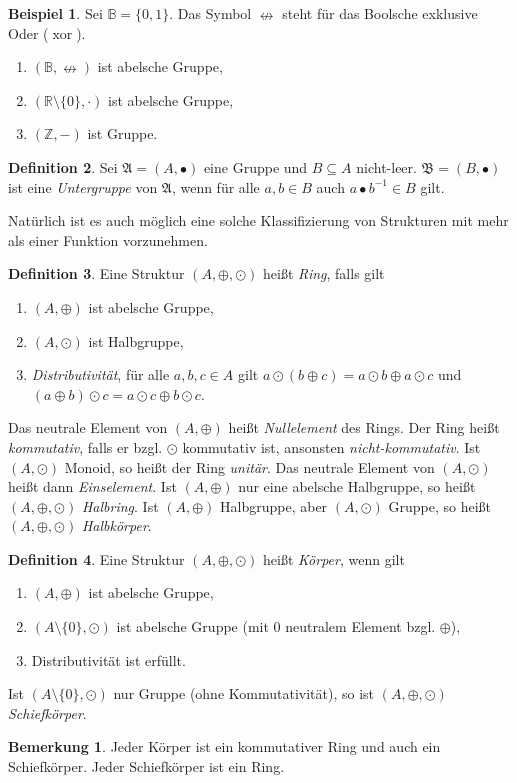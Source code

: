 \documentclass[11pt, a4paper]{article}
\theoremstyle{definition}
\newtheorem{definition}{Definition}[section]
\newtheorem{example}[definition]{Beispiel}
\newtheorem*{remark*}{Bemerkung}
\theoremstyle{plain}
\numberwithin{equation}{section}
\DeclareMathOperator{\xor}{xor}
\begin{document}
\begin{example}
	Sei \( \mathbb{B} = \{ 0, 1 \} \). Das Symbol \( \nleftrightarrow \) steht für das Boolsche exklusive Oder (\( \xor \)).
	\begin{enumerate}
		\item \( (\mathbb{B}, \nleftrightarrow) \) ist abelsche Gruppe,
		\item \( (\mathbb{R} \setminus \{ 0 \}, \cdot) \) ist abelsche Gruppe,
		\item \( (\mathbb{Z}, -) \) ist Gruppe.
	\end{enumerate}
\end{example}
\begin{definition}
	Sei \( \mathfrak{A} = (A, \bullet) \) eine Gruppe und \( B \subseteq A \) nicht-leer. \( \mathfrak{B} = (B, \bullet) \) ist eine \textit{Untergruppe} von \( \mathfrak{A} \), wenn für alle \( a, b \in B \) auch \( a \bullet b^{-1} \in B \) gilt.
\end{definition}
Natürlich ist es auch möglich eine solche Klassifizierung von Strukturen mit mehr als einer Funktion vorzunehmen.
\begin{definition}
	Eine Struktur \( (A, \oplus, \odot) \) heißt \textit{Ring}, falls gilt
	\begin{enumerate}
		\item \( (A, \oplus) \) ist abelsche Gruppe,
		\item \( (A, \odot) \) ist Halbgruppe,
		\item \textit{Distributivität}, für alle \( a, b, c \in A \) gilt \( a \odot (b \oplus c) = a \odot b \oplus a \odot c \) und \( (a \oplus b) \odot c = a \odot c \oplus b \odot c \).
	\end{enumerate}
	Das neutrale Element von \( (A, \oplus) \) heißt \textit{Nullelement} des Rings. Der Ring heißt \textit{kommutativ}, falls er bzgl. \( \odot \) kommutativ ist, ansonsten \textit{nicht-kommutativ}. Ist \( (A, \odot) \) Monoid, so heißt der Ring \textit{unitär}. Das neutrale Element von \( (A, \odot) \) heißt dann \textit{Einselement}. Ist \( (A, \oplus) \) nur eine abelsche Halbgruppe, so heißt \( (A, \oplus, \odot) \) \textit{Halbring}. Ist \( ( A, \oplus) \) Halbgruppe, aber \( (A, \odot) \) Gruppe, so heißt \( (A, \oplus, \odot) \) \textit{Halbkörper}.
\end{definition}
\begin{definition}
	Eine Struktur \( (A, \oplus, \odot) \) heißt \textit{Körper}, wenn gilt
	\begin{enumerate}
		\item \( (A, \oplus) \) ist abelsche Gruppe,
		\item \( (A \setminus \{0\}, \odot) \) ist abelsche Gruppe (mit \( 0 \) neutralem Element bzgl. \( \oplus \)),
		\item Distributivität ist erfüllt.
	\end{enumerate}
	Ist \( (A \setminus \{0\}, \odot) \) nur Gruppe (ohne Kommutativität), so ist \( (A, \oplus, \odot) \) \textit{Schiefkörper}.
\end{definition}
\begin{remark*}
	Jeder Körper ist ein kommutativer Ring und auch ein Schiefkörper. Jeder Schiefkörper ist ein Ring.
\end{remark*}
\end{document}
